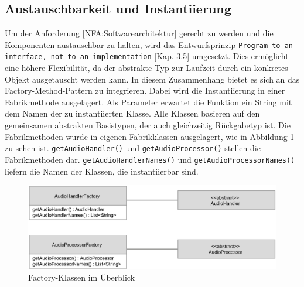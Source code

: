 \FloatBarrier

\subsection{Austauschbarkeit und Instantiierung}
Um der Anforderung \ref{NFA:Softwarearchitektur} gerecht zu werden und die Komponenten austauschbar zu halten, wird das Entwurfsprinzip \texttt{Program to an interface, not to an implementation} \cite{Lahres2009}[Kap. 3.5] umgesetzt. Dies ermöglicht eine höhere Flexibilität, da der abstrakte Typ zur Laufzeit durch ein konkretes Objekt ausgetauscht werden kann. In diesem Zusammenhang bietet es sich an das Factory-Method-Pattern zu integrieren. Dabei wird die Instantiierung in einer Fabrikmethode ausgelagert. Als Parameter erwartet die Funktion ein String mit dem Namen der zu instantiierten Klasse. Alle Klassen basieren auf den gemeinsamen abstrakten Basistypen, der auch gleichzeitig Rückgabetyp ist. Die Fabrikmethoden wurde in eigenen Fabrikklassen ausgelagert, wie in Abbildung \ref{Fig:Factories} zu sehen ist. \texttt{getAudioHandler()} und \texttt{getAudioProcessor()} stellen die Fabrikmethoden dar. \texttt{getAudioHandlerNames()} und \texttt{getAudioProcessorNames()} liefern die Namen der Klassen, die instantiierbar sind.
\newline
\begin{figure}[htp]
\centering
\includegraphics[width=1\textwidth]{../img/Factories}
\caption{Factory-Klassen im Überblick}
\label{Fig:Factories}
\end{figure}

\FloatBarrier


